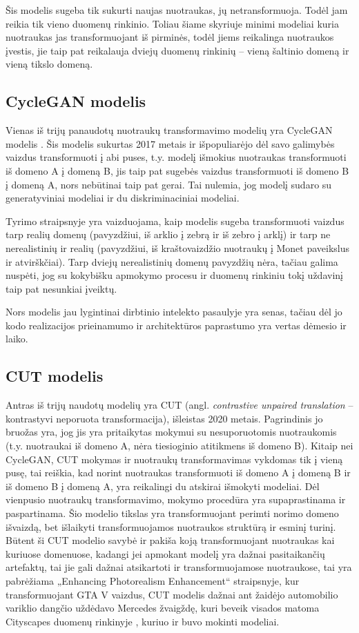 \documentclass{VUMIFPSkursinis}
\begin{document}
        Šis modelis sugeba tik sukurti naujas nuotraukas, jų netransformuoja. Todėl jam reikia tik vieno duomenų rinkinio. Toliau šiame skyriuje minimi modeliai kuria nuotraukas jas transformuojant iš pirminės, todėl jiems reikalinga nuotraukos įvestis, jie taip pat reikalauja dviejų duomenų rinkinių – vieną šaltinio domeną ir vieną tikslo domeną.
    \subsection{CycleGAN modelis}
        Vienas iš trijų panaudotų nuotraukų transformavimo modelių yra CycleGAN modelis \cite{CycleGAN2017}. Šis modelis sukurtas 2017 metais ir išpopuliarėjo dėl savo galimybės vaizdus transformuoti į abi puses, t.y. modelį išmokius nuotraukas transformuoti iš domeno A į domeną B, jis taip pat sugebės vaizdus transformuoti iš domeno B į domeną A, nors nebūtinai taip pat gerai. Tai nulemia, jog modelį sudaro su generatyviniai modeliai ir du diskriminaciniai modeliai.

        Tyrimo straipsnyje yra vaizduojama, kaip modelis sugeba transformuoti vaizdus tarp realių domenų (pavyzdžiui, iš arklio į zebrą ir iš zebro į arklį) ir tarp ne nerealistinių ir realių (pavyzdžiui, iš kraštovaizdžio nuotraukų į Monet paveikslus ir atvirškčiai). Tarp dviejų nerealistinių domenų pavyzdžių nėra, tačiau galima nuspėti, jog su kokybišku apmokymo procesu ir duomenų rinkiniu tokį uždavinį taip pat nesunkiai įveiktų.

        Nors modelis jau lygintinai dirbtinio intelekto pasaulyje yra senas, tačiau dėl jo kodo realizacijos prieinamumo ir architektūros paprastumo yra vertas dėmesio ir laiko.
        
    \subsection{CUT modelis}
        Antras iš trijų naudotų modelių yra CUT (angl. \emph{contrastive unpaired translation} – kontrastyvi neporuota transformacija), išleistas 2020 metais. Pagrindinis jo bruožas yra, jog jis yra pritaikytas mokymui su nesuporuotomis nuotraukomis (t.y. nuotraukai iš domeno A, nėra tiesioginio atitikmens iš domeno B). Kitaip nei CycleGAN, CUT mokymas ir nuotraukų transformavimas vykdomas tik į vieną pusę, tai reiškia, kad norint nuotraukas transformuoti iš domeno A į domeną B ir iš domeno B į domeną A, yra reikalingi du atskirai išmokyti modeliai. Dėl vienpusio nuotraukų transformavimo, mokymo procedūra yra supaprastinama ir paspartinama. Šio modelio tikslas yra transformuojant perimti norimo domeno išvaizdą, bet išlaikyti transformuojamos nuotraukos struktūrą ir esminį turinį. Būtent ši CUT modelio savybė ir pakiša koją transformuojant nuotraukas kai kuriuose domenuose, kadangi jei apmokant modelį yra dažnai pasitaikančių artefaktų, tai jie gali dažnai atsikartoti ir transformuojamose nuotraukose, tai yra pabrėžiama „Enhancing Photorealism Enhancement“ \cite{EnPhEn} straipsnyje, kur transformuojant GTA V vaizdus, CUT modelis dažnai ant žaidėjo automobilio variklio dangčio uždėdavo Mercedes žvaigždę, kuri beveik visados matoma Cityscapes duomenų rinkinyje \cite{DaimCityDaSe}, kuriuo ir buvo mokinti modeliai.
\end{document}
